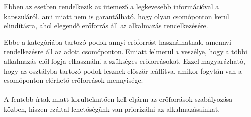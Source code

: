 Ebben az esetben rendelkezik az ütemező a legkevesebb információval a kapszuláról, ami miatt nem is garantálható, hogy olyan csomóponton kerül elindításra, ahol elegendő erőforrás áll az alkalmazás rendelkezésére.

Ebbe a kategóriába tartozó podok annyi erőforrást használhatnak, amennyi rendelkezésre áll az adott csomóponton.
Emiatt felmerül a veszélye, hogy a többi alkalmazás elől fogja elhasználni a szükséges erőforrásokat. 
Ezzel magyarázható, hogy az osztályba tartozó podok lesznek először leállítva, amikor fogytán van a csomóponton elérhető erőforrások mennyisége.
\\
\\
A fentebb írtak miatt körültekintően kell eljárni az erőforrások szabályozása közben, hiszen ezáltal lehetőségünk van priorizálni az alkalmazásainkat.
